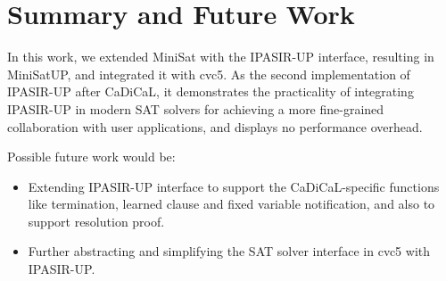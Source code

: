 \chapter{Summary and Future Work}

In this work, we extended MiniSat with the IPASIR-UP interface, resulting in MiniSatUP, and integrated it with cvc5. As the second implementation of IPASIR-UP after CaDiCaL, it demonstrates the practicality of integrating IPASIR-UP in modern SAT solvers for achieving a more fine-grained collaboration with user applications, and displays no performance overhead.

Possible future work would be:

\begin{itemize}
  \item Extending IPASIR-UP interface to support the CaDiCaL-specific functions like termination, learned clause and fixed variable notification, and also to support resolution proof.
  \item Further abstracting and simplifying the SAT solver interface in cvc5 with IPASIR-UP.
\end{itemize}
